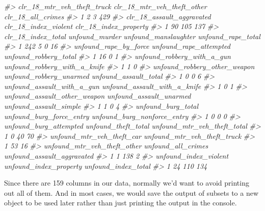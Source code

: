 \documentclass[
  12pt,
]{book}
\newenvironment{Shaded}{\begin{snugshade}}{\end{snugshade}}
\newcommand{\CommentTok}[1]{\textcolor[rgb]{0.37,0.37,0.37}{\textit{#1}}}
\begin{document}
\begin{Shaded}
\begin{Highlighting}[]
\CommentTok{\#>   clr\_18\_mtr\_veh\_theft\_truck clr\_18\_mtr\_veh\_theft\_other clr\_18\_all\_crimes}
\CommentTok{\#> 1                          2                          3               429}
\CommentTok{\#>   clr\_18\_assault\_aggravated clr\_18\_index\_violent clr\_18\_index\_property}
\CommentTok{\#> 1                        90                  105                   137}
\CommentTok{\#>   clr\_18\_index\_total unfound\_murder unfound\_manslaughter unfound\_rape\_total}
\CommentTok{\#> 1                242              5                    0                 16}
\CommentTok{\#>   unfound\_rape\_by\_force unfound\_rape\_attempted unfound\_robbery\_total}
\CommentTok{\#> 1                    16                      0                     1}
\CommentTok{\#>   unfound\_robbery\_with\_a\_gun unfound\_robbery\_with\_a\_knife}
\CommentTok{\#> 1                          1                            0}
\CommentTok{\#>   unfound\_robbery\_other\_weapon unfound\_robbery\_unarmed unfound\_assault\_total}
\CommentTok{\#> 1                            0                       0                     6}
\CommentTok{\#>   unfound\_assault\_with\_a\_gun unfound\_assault\_with\_a\_knife}
\CommentTok{\#> 1                          0                            1}
\CommentTok{\#>   unfound\_assault\_other\_weapon unfound\_assault\_unarmed unfound\_assault\_simple}
\CommentTok{\#> 1                            1                       0                      4}
\CommentTok{\#>   unfound\_burg\_total unfound\_burg\_force\_entry unfound\_burg\_nonforce\_entry}
\CommentTok{\#> 1                  0                        0                           0}
\CommentTok{\#>   unfound\_burg\_attempted unfound\_theft\_total unfound\_mtr\_veh\_theft\_total}
\CommentTok{\#> 1                      0                  40                          70}
\CommentTok{\#>   unfound\_mtr\_veh\_theft\_car unfound\_mtr\_veh\_theft\_truck}
\CommentTok{\#> 1                        53                          16}
\CommentTok{\#>   unfound\_mtr\_veh\_theft\_other unfound\_all\_crimes unfound\_assault\_aggravated}
\CommentTok{\#> 1                           1                138                          2}
\CommentTok{\#>   unfound\_index\_violent unfound\_index\_property unfound\_index\_total}
\CommentTok{\#> 1                    24                    110                 134}
\end{Highlighting}
\end{Shaded}

Since there are 159 columns in our data, normally we'd want to avoid printing out all of them. And in most cases, we would save the output of subsets to a new object to be used later rather than just printing the output in the console.
\end{document}

